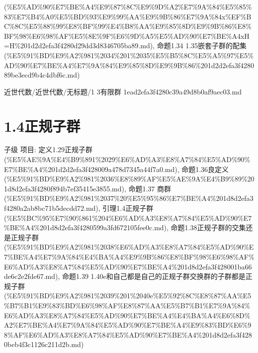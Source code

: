 \begin{note}[1.3有限群]
(\%E5\%AD\%90\%E7\%BE\%A4\%E9\%87\%8C\%E9\%9D\%A2\%E7\%9A\%84\%E5\%85\%83\%E7\%B4\%A0\%E5\%BD\%93\%E9\%99\%AA\%E9\%9B\%86\%E7\%9A\%84x\%EF\%BC\%8C\%E5\%88\%99\%E8\%BF\%99\%E4\%B8\%AA\%E9\%85\%8D\%E9\%9B\%86\%E8\%BF\%98\%E6\%98\%AF\%E5\%8E\%9F\%E6\%9D\%A5\%E5\%AD\%90\%E7\%BE\%A4xH=H\%201d2d2efa3f4280d29dd3d8346705ba89.md), 命题1.34 1.35嵌套子群的配集 (\%E5\%91\%BD\%E9\%A2\%981\%2034\%201\%2035\%E5\%B5\%8C\%E5\%A5\%97\%E5\%AD\%90\%E7\%BE\%A4\%E7\%9A\%84\%E9\%85\%8D\%E9\%9B\%86\%201d2d2efa3f428089be3ecd9b4c4dbf6c.md)

\end{note}

\begin{note}[来源路径]

近世代数/近世代数/无标题/1 3有限群 1ead2efa3f4280c39a49d8b0af9aec03.md

\end{note}

\section*{1.4正规子群}

\begin{note}[1.4正规子群]

子级 项目: 定义1.29正规子群 (\%E5\%AE\%9A\%E4\%B9\%891\%2029\%E6\%AD\%A3\%E8\%A7\%84\%E5\%AD\%90\%E7\%BE\%A4\%201d2d2efa3f428009a478d7345a44f7a0.md), 命题1.36良定义 (\%E5\%91\%BD\%E9\%A2\%981\%2036\%E8\%89\%AF\%E5\%AE\%9A\%E4\%B9\%89\%201d8d2efa3f4280f894b7ef35415e3855.md), 命题1.37 商群 (\%E5\%91\%BD\%E9\%A2\%981\%2037\%20\%E5\%95\%86\%E7\%BE\%A4\%201d8d2efa3f4280a2ab8bc71b5decdd72.md), 引理1.4正规子群 (\%E5\%BC\%95\%E7\%90\%861\%204\%E6\%AD\%A3\%E8\%A7\%84\%E5\%AD\%90\%E7\%BE\%A4\%201d8d2efa3f4280599a3fd672105fee0c.md), 命题1.38正规子群的交集还是正规子群 (\%E5\%91\%BD\%E9\%A2\%981\%2038\%E6\%AD\%A3\%E8\%A7\%84\%E5\%AD\%90\%E7\%BE\%A4\%E7\%9A\%84\%E4\%BA\%A4\%E9\%9B\%86\%E8\%BF\%98\%E6\%98\%AF\%E6\%AD\%A3\%E8\%A7\%84\%E5\%AD\%90\%E7\%BE\%A4\%201d8d2efa3f428001ba66de6c2e2fde67.md), 命题1.39 1.40e和自己都是自己的正规子群交换群的子群都是正规子群 (\%E5\%91\%BD\%E9\%A2\%981\%2039\%201\%2040e\%E5\%92\%8C\%E8\%87\%AA\%E5\%B7\%B1\%E9\%83\%BD\%E6\%98\%AF\%E8\%87\%AA\%E5\%B7\%B1\%E7\%9A\%84\%E6\%AD\%A3\%E8\%A7\%84\%E5\%AD\%90\%E7\%BE\%A4\%E4\%BA\%A4\%E6\%8D\%A2\%E7\%BE\%A4\%E7\%9A\%84\%E5\%AD\%90\%E7\%BE\%A4\%E9\%83\%BD\%E6\%98\%AF\%E6\%AD\%A3\%E8\%A7\%84\%E5\%AD\%90\%E7\%BE\%A4\%201d8d2efa3f4280beb4f3c1126c211d2b.md)

\end{note}

